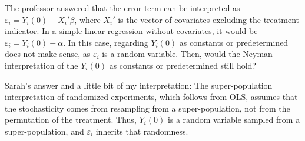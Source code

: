 \documentclass[11pt]{article}
\numberwithin{equation}{section}
\begin{document}
The professor answered that the error term can be interpreted as $\varepsilon_i = Y_i(0) - X_i'\beta$, where $X_i'$ is the vector of covariates excluding the treatment indicator.
In a simple linear regression without covariates, it would be $\varepsilon_i = Y_i(0) - \alpha$.
In this case, regarding $Y_i(0)$ as constants or predetermined does not make sense, as $\varepsilon_i$ is a random variable.
Then, would the Neyman interpretation of the $Y_i(0)$ as constants or predetermined still hold?


{\color{blue}
Sarah's answer and a little bit of my interpretation: The super-population interpretation of randomized experiments, which follows from OLS, assumes that the stochasticity comes from resampling from a super-population, not from the permutation of the treatment.
Thus, $Y_i(0)$ is a random variable sampled from a super-population, and $\varepsilon_i$ inherits that randomness.

}
\end{document}

